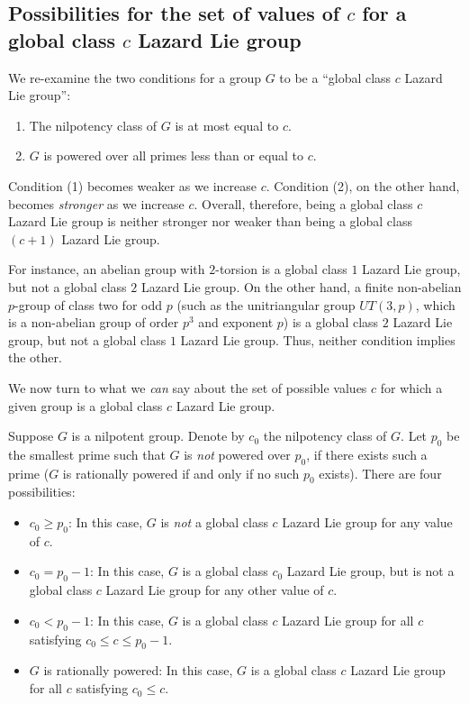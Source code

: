 \subsection{Possibilities for the set of values of $c$ for a global class $c$ Lazard Lie group}\label{sec:global-class-c-multiple-c-values}

We re-examine the two conditions for a group $G$ to be a ``global
class $c$ Lazard Lie group'':

\begin{enumerate}
\item The nilpotency class of $G$ is at most equal to $c$.
\item $G$ is powered over all primes less than or equal to $c$.
\end{enumerate}

Condition (1) becomes weaker as we increase $c$. Condition (2), on the
other hand, becomes {\em stronger} as we increase $c$. Overall,
therefore, being a global class $c$ Lazard Lie group is neither
stronger nor weaker than being a global class $(c + 1)$ Lazard Lie
group.

For instance, an abelian group with $2$-torsion is a global class $1$
Lazard Lie group, but not a global class $2$ Lazard Lie group. On the
other hand, a finite non-abelian $p$-group of class two for odd $p$
(such as the unitriangular group $UT(3,p)$, which is a non-abelian
group of order $p^3$ and exponent $p$) is a global class $2$ Lazard
Lie group, but not a global class $1$ Lazard Lie group. Thus, neither
condition implies the other.

We now turn to what we {\em can} say about the set of possible values
$c$ for which a given group is a global class $c$ Lazard Lie group.

Suppose $G$ is a nilpotent group. Denote by $c_0$ the nilpotency class
of $G$. Let $p_0$ be the smallest prime such that $G$ is {\em not}
powered over $p_0$, if there exists such a prime ($G$ is rationally
powered if and only if no such $p_0$ exists). There are four
possibilities:

\begin{itemize}
\item $c_0 \ge p_0$: In this case, $G$ is {\em not} a global class $c$
  Lazard Lie group for any value of $c$.
\item $c_0 = p_0 - 1$: In this case, $G$ is a global class $c_0$
  Lazard Lie group, but is not a global class $c$ Lazard Lie group for
  any other value of $c$.
\item $c_0 < p_0 - 1$: In this case, $G$ is a global class $c$ Lazard
  Lie group for all $c$ satisfying $c_0 \le c \le p_0 - 1$.
\item $G$ is rationally powered: In this case, $G$ is a global class
  $c$ Lazard Lie group for all $c$ satisfying $c_0 \le c$.
\end{itemize}

